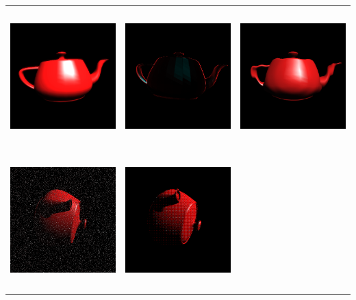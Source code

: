 \documentclass[12pt,a4paper,titlepage,final]{report}
\begin{document}
\begin{center}
\begin{tabular}{lcr}
	\includegraphics[height=53mm]{images/bloom.png} &		
	\includegraphics[height=53mm]{images/sobel.png} &
	\includegraphics[height=53mm]{images/vlneni.png} \\
	
	\includegraphics[height=53mm]{images/sum.png} &		
	\includegraphics[height=53mm]{images/dithering.png} &
\end{tabular}
\end{center}
\end{document}
